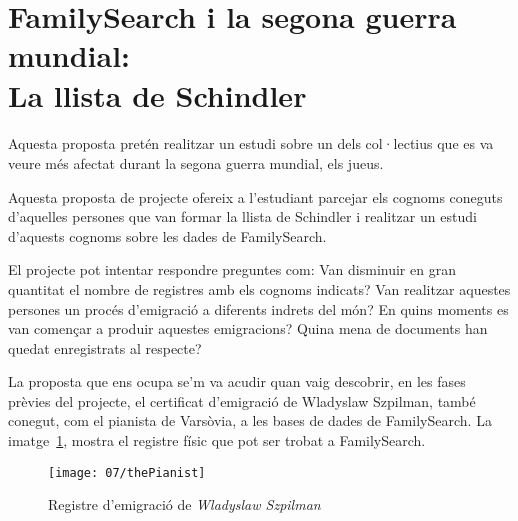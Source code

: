 \section{FamilySearch i la segona guerra mundial:\\La llista de Schindler}

    \paragraph{}
    Aquesta proposta pretén realitzar un estudi sobre un dels col·lectius que es va veure més afectat durant la segona guerra mundial, els jueus.

    Aquesta proposta de projecte ofereix a l'estudiant parcejar els cognoms coneguts d'aquelles persones que van formar la llista de Schindler i realitzar un estudi d'aquests cognoms sobre les dades de FamilySearch.

    El projecte pot intentar respondre preguntes com: Van disminuir en gran quantitat el nombre de registres amb els cognoms indicats? Van realitzar aquestes persones un procés d'emigració a diferents indrets del món? En quins moments es van començar a produir aquestes emigracions? Quina mena de documents han quedat enregistrats al respecte?

    La proposta que ens ocupa se'm va acudir quan vaig descobrir, en les fases prèvies del projecte, el certificat d'emigració de Wladyslaw Szpilman, també conegut, com el pianista de Varsòvia, a les bases de dades de FamilySearch. La imatge~\ref{fig:thePianist}, mostra el registre físic que pot ser trobat a FamilySearch.

    \begin{figure}[h]
        \texttt{[image: 07/thePianist]}
        \centering
        \caption{Registre d'emigració de \emph{Wladyslaw Szpilman}\label{fig:thePianist}}
    \end{figure}
